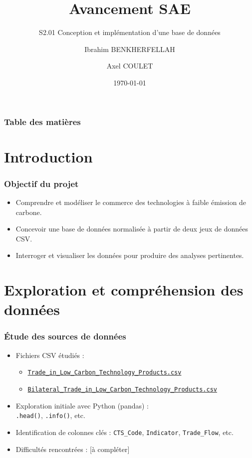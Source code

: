 \documentclass[11pt]{beamer}
\title[Présentation]{Avancement SAE}
\subtitle{S2.01 Conception et implémentation d'une base de données}
\author[Ibrahim BENKHERFELLAH \and Axel COULET]{Ibrahim BENKHERFELLAH \and Axel COULET}
\institute[USPN]{Université Sorbonne Paris Nord \\}
\date[\today]{\today}
\begin{document}
\maketitle

\begin{frame}
  \frametitle{Table des matières}
  \tableofcontents
\end{frame}

\section{Introduction}
\begin{frame}
  \frametitle{Objectif du projet}
  \begin{itemize}
    \item<1-> Comprendre et modéliser le commerce des technologies à faible émission de carbone.
    \item<2-> Concevoir une base de données normalisée à partir de deux jeux de données CSV.
    \item<3-> Interroger et visualiser les données pour produire des analyses pertinentes.
  \end{itemize}
\end{frame}

\section{Exploration et compréhension des données}
\begin{frame}
  \frametitle{Étude des sources de données}
  \begin{itemize}
    \item Fichiers CSV étudiés :
      \begin{itemize}
        \item<1-> \texttt{\href{https://climatedata.imf.org/datasets/1d33174e9e46429d9e570d539556f66a/explore}{Trade\_in\_Low\_Carbon\_Technology\_Products.csv}}
        \item \texttt{\href{https://climatedata.imf.org/datasets/975bc577fe7342c2a3651e8841959c47_0/explore}{Bilateral\_Trade\_in\_Low\_Carbon\_Technology\_Products.csv}}
      \end{itemize}
    \item<2-> Exploration initiale avec Python (pandas) : \\
          \texttt{.head()}, \texttt{.info()}, etc.
    \item<3-> Identification de colonnes clés : \texttt{CTS\_Code}, \texttt{Indicator}, \texttt{Trade\_Flow}, etc.
    \item<4-> Difficultés rencontrées : [à compléter]
  \end{itemize}
\end{frame}
\end{document}
